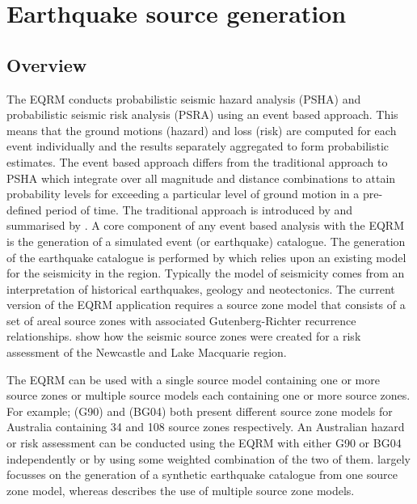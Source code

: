 \chapter{Earthquake source generation}
\label{ch:source}

\section{Overview}

The EQRM conducts probabilistic seismic hazard analysis (PSHA) and
probabilistic seismic risk analysis (PSRA) using an event based
approach. This means that the ground motions (hazard) and loss
(risk) are computed for each event individually and the results
separately aggregated to form probabilistic estimates. The event
based approach differs from the traditional approach to PSHA which
integrate over all magnitude and distance combinations to attain
probability levels for exceeding a particular level of ground
motion in a pre-defined period of time. The traditional approach
is introduced by \citet{dr_Cornell68a} and summarised by
\citet{dr_McGuire90a}. A core component of any event based
analysis with the EQRM is the generation of a simulated
event (or earthquake) catalogue. The
generation of the earthquake catalogue is performed by
 which relies upon an existing model for
the seismicity
 in the region. Typically the  model of seismicity comes
 from an interpretation of historical earthquakes,
 geology and neotectonics. The current version of the EQRM application requires a source zone model
that consists of a set of areal source zones with associated
Gutenberg-Richter recurrence relationships. \citet{dr_Dhu02b} show
how the seismic source zones were created for a risk assessment of
the Newcastle and Lake Macquarie region.

The EQRM can be used with a single source model containing one or
more source zones or multiple source models each containing one or
more source zones. For example; \citet{dr_Gaull90a} (G90) and
\citet{dr_Brown04a} (BG04) both present different source zone
models for Australia containing 34 and 108 source zones
respectively. An Australian hazard or risk assessment can be
conducted using the EQRM with either G90 or BG04 independently or
by using some weighted combination of the two of them.
 largely focusses on the generation of a
synthetic earthquake catalogue from one source zone model, whereas
 describes the use of multiple source
zone models.

